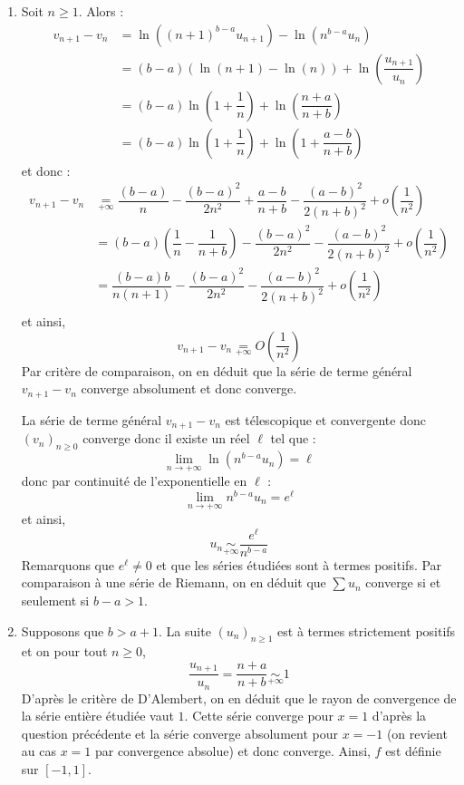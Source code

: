 \documentclass[a4paper,twoside,french,11pt]{VcCours}
\begin{document}
\begin{corr} 
\begin{enumerate}
\item Soit $n \geq 1$. Alors :
\begin{align*}
v_{n+1}-v_n & = \ln((n+1)^{b-a} u_{n+1}) - \ln(n^{b-a} u_n) \\
& = (b-a) (\ln(n+1)- \ln(n)) + \ln \left( \dfrac{u_{n+1}}{u_n} \right) \\
& = (b-a) \ln \left( 1+\dfrac{1}{n} \right) + \ln\left( \dfrac{n+a}{n+b} \right) \\
& = (b-a) \ln \left( 1+\dfrac{1}{n} \right) + \ln\left( 1+\dfrac{a-b}{n+b} \right) 
\end{align*}
et donc :
\begin{align*}
v_{n+1}-v_n  & \underset{+ \infty}{=} \dfrac{(b-a)}{n} - \dfrac{(b-a)^2}{2n^2} +\dfrac{a-b}{n+b} - \dfrac{(a-b)^2}{2(n+b)^2} + o \left( \dfrac{1}{n^2} \right) \\
& = (b-a) \left( \dfrac{1}{n} - \dfrac{1}{n+b} \right) - \dfrac{(b-a)^2}{2n^2} - \dfrac{(a-b)^2}{2(n+b)^2} + o \left( \dfrac{1}{n^2} \right) \\
& = \dfrac{(b-a)b}{n(n+1)} - \dfrac{(b-a)^2}{2n^2} - \dfrac{(a-b)^2}{2(n+b)^2} + o \left( \dfrac{1}{n^2} \right) \\
\end{align*}
et ainsi,
$$ v_{n+1}-v_n \underset{+ \infty}{=}  O \left( \dfrac{1}{n^2} \right)$$
Par critère de comparaison, on  en déduit que la série de terme général $v_{n+1}-v_n$ converge absolument et donc converge.


La série de terme général $v_{n+1}-v_n$ est télescopique et convergente donc $(v_n)_{n \geq 0}$ converge donc il existe un réel $\ell$ tel que :
$$ \lim_{n \rightarrow + \infty} \ln(n^{b-a} u_n) = \ell$$
donc par continuité de l'exponentielle en $\ell$ :
$$ \lim_{n \rightarrow + \infty} n^{b-a} u_n = e^{\ell}$$
et ainsi,
$$ u_n \underset{+ \infty}{\sim} \dfrac{e^{\ell}}{n^{b-a}}$$
Remarquons que $e^{\ell} \neq 0$ et que les séries étudiées sont à termes positifs. Par comparaison à une série de Riemann, on en déduit que $\sum u_n$ converge si et seulement si $b-a>1$.
\item Supposons que $b>a+1$. La suite $(u_n)_{n \geq 1}$ est à termes strictement positifs et on pour tout $n \geq 0$,
$$ \dfrac{u_{n+1}}{u_n} = \dfrac{n+a}{n+b} \underset{+ \infty}{\sim} 1$$
D'après le critère de D'Alembert, on en déduit que le rayon de convergence de la série entière étudiée vaut $1$. Cette série converge pour $x=1$ d'après la question précédente et la série converge absolument pour $x=-1$ (on revient au cas $x=1$ par convergence absolue) et donc converge. Ainsi, $f$ est définie sur $[-1,1]$.



\end{enumerate}
\end{corr}
\end{document}
